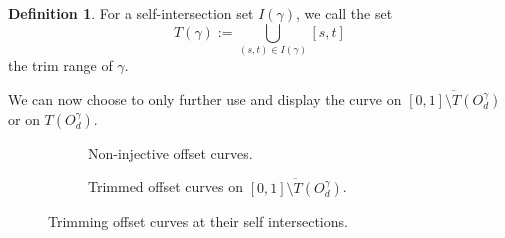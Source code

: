 \documentclass[a4paper, 11pt]{report}
\theoremstyle{definition}
\newtheorem{definition}{Definition}[section]
\begin{document}
	\begin{definition}
		For a self-intersection set $I(\gamma)$, we call the set
			$$T(\gamma) := \bigcup_{(s,t) \in I(\gamma)} [s,t]$$
		the trim range of $\gamma$.
	\end{definition}

	We can now choose to only further use and display the curve on $\overline{[0,1] \setminus T(O^\gamma_d)}$ or on $T(O^\gamma_d)$.

	\begin{figure}[H]
		\centering
		\begin{subfigure}{0.45\textwidth}
			
			\caption{Non-injective offset curves.}
		\end{subfigure}
		\begin{subfigure}{0.45\textwidth}
			
			\caption{Trimmed offset curves on $\overline{[0,1] \setminus T(O^\gamma_d)}$.}
		\end{subfigure}
		\caption{Trimming offset curves at their self intersections.}
		\label{fig:trimoffset}
	\end{figure}
\end{document}
